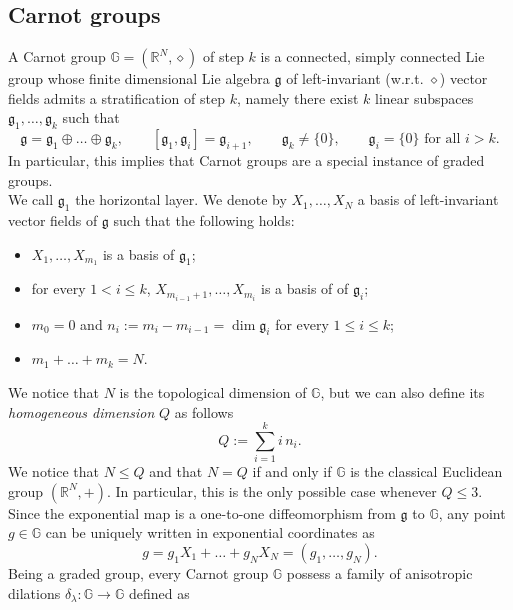 \documentclass[11pt]{amsart}
\numberwithin{equation}{section} %
\theoremstyle{definition}
\begin{document}
\subsection{Carnot groups}
A Carnot group $\mathbb{G}=(\mathbb{R}^{N},\diamond)$ of step $k$ is a connected, simply connected Lie group whose finite dimensional Lie algebra $\mathfrak{g}$ of left-invariant (w.r.t. $\diamond$) vector fields admits a stratification of step $k$, namely there exist $k$ linear subspaces $\mathfrak{g}_1, \ldots, \mathfrak{g}_k$ such that
\begin{equation*}
	\mathfrak{g} = \mathfrak{g}_{1}\oplus \ldots \oplus \mathfrak{g}_{k}, \qquad [\mathfrak{g}_1,\mathfrak{g}_i]=\mathfrak{g}_{i+1}, \qquad \mathfrak{g}_{k}\neq \{0\}, \qquad \mathfrak{g}_i = \{0\} \textrm{ for all } i>k.
\end{equation*}
In particular, this implies that Carnot groups are a special instance of graded groups.\\
We call $\mathfrak{g}_1$ the horizontal layer. We denote by $X_1, \ldots, X_{N}$ a basis of left-invariant vector fields of $\mathfrak{g}$ such that the following holds:
\begin{itemize}
	\item $X_1, \ldots, X_{m_1}$ is a basis of $\mathfrak{g}_{1}$;
	\item for every $1<i\leq k$, $X_{m_{i-1}+1},\ldots, X_{m_{i}}$ is a basis of of $\mathfrak{g}_{i}$;
	\item $m_{0}=0$ and $n_i := m_{i}-m_{i-1} = \dim \mathfrak{g}_i$ for every $1\leq i\leq k$;
	\item $m_1 + \ldots + m_k = N$.
\end{itemize}
We notice that $N$ is the topological dimension of $\mathbb{G}$, but we can also define its {\em homogeneous dimension} $Q$ as follows
\begin{equation}\label{eq:Def_Q}
	Q:= \sum_{i=1}^{k}i \, n_{i}.
\end{equation}
We notice that $N \leq Q$ and that $N=Q$ if and only if $\mathbb{G}$ is the classical Euclidean group $(\mathbb{R}^{N},+)$. In particular, this is the only possible case whenever $Q \leq 3$.\\
Since the exponential map is a one-to-one diffeomorphism from $\mathfrak{g}$ to $\mathbb{G}$, any point $g\in \mathbb{G}$ can be uniquely written in exponential coordinates as
\begin{equation*}
	g = g_1 X_1 + \ldots + g_N X_N = (g_1, \ldots, g_N).
\end{equation*}
Being a graded group, every Carnot group $\mathbb{G}$ possess a family of anisotropic dilations $\delta_{\lambda}: \mathbb{G}\to \mathbb{G}$ defined as
\end{document}
